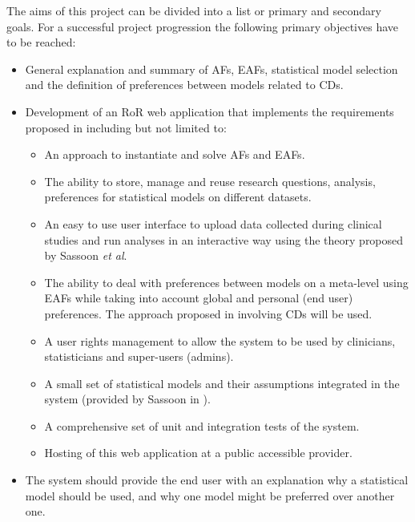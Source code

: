 The aims of this project can be divided into a list or primary and secondary goals. For a successful project progression the following primary objectives have to be reached:
\begin{itemize}
	\item General explanation and summary of \glspl{AF}, \glspl{EAF}, statistical model selection and the definition of preferences between models related to \glspl{CD}.
	\item Development of an \gls{RoR} web application that implements the requirements proposed in \cite{sassoon2014,sassoon2016CD} including but not limited to:
	\begin{itemize}
		\item An approach to instantiate and solve \glspl{AF} and \glspl{EAF}.
		\item The ability to store, manage and reuse research questions, analysis, preferences for statistical models on different datasets.
		\item An easy to use user interface to upload data collected during clinical studies and run analyses in an interactive way using the theory proposed by Sassoon \textit{et al}.
		\item The ability to deal with preferences between models on a meta-level using \glspl{EAF} while taking into account global and personal (end user) preferences. The approach proposed in \cite{sassoon2016CD} involving \glspl{CD} will be used.
		\item A user rights management to allow the system to be used by clinicians, statisticians and super-users (admins).
		\item A small set of statistical models and their assumptions integrated in the system (provided by Sassoon in \cite{sassoon2016CD}).
		\item A comprehensive set of unit and integration tests of the system.
		\item Hosting of this web application at a public accessible provider.
	\end{itemize}	
	\item The system should provide the end user with an explanation why a statistical model should be used, and why one model might be preferred over another one.
\end{itemize}

\bigskip

